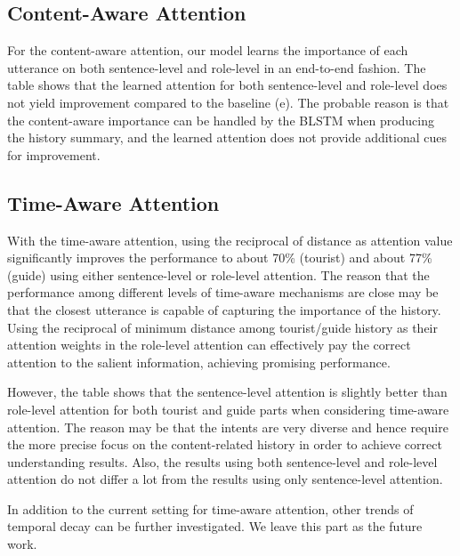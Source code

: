 \documentclass{article}
\begin{document}
\subsection{Content-Aware Attention}
For the content-aware attention, our model learns the importance of each utterance on both sentence-level and role-level in an end-to-end fashion.
The table shows that the learned attention for both sentence-level and role-level does not yield improvement compared to the baseline (e). 
The probable reason is that the content-aware importance can be handled by the BLSTM when producing the history summary, and the learned attention does not provide additional cues for improvement.

\subsection{Time-Aware Attention}
With the time-aware attention, using the reciprocal of distance as attention value significantly improves the performance to about 70\% (tourist) and about 77\% (guide) using either sentence-level or role-level attention. 
The reason that the performance among different levels of time-aware mechanisms are close may be that the closest utterance is capable of capturing the importance of the history.
Using the reciprocal of minimum distance among tourist/guide history as their attention weights in the role-level attention can effectively pay the correct attention to the salient information, achieving promising performance.

However, the table shows that the sentence-level attention is slightly better than role-level attention for both tourist and guide parts when considering time-aware attention.
The reason may be that the intents are very diverse and hence require the more precise focus on the content-related history in order to achieve correct understanding results. 
Also, the results using both sentence-level and role-level attention do not differ a lot from the results using only sentence-level attention.

In addition to the current setting for time-aware attention, other trends of temporal decay can be further investigated.
We leave this part as the future work.
\end{document}
